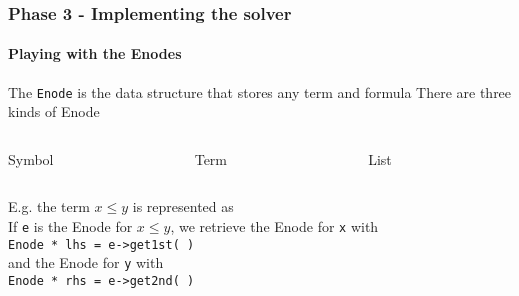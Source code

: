 \begin{frame}[fragile]
  \frametitle{Phase 3 - Implementing the solver}
  \framesubtitle{Playing with the Enodes}

  \scriptsize

  The \verb|Enode| is the data structure that stores any
  term and formula
  \vfill
  There are three kinds of Enode
  \vfill
  \begin{columns}

    \begin{column}{.2\textwidth}
      \begin{center}
      Symbol
      \bigskip\\
       
      \end{center}
    \end{column}

    \begin{column}{.3\textwidth}
      \begin{center}
      Term
      \bigskip\\
       
      \end{center}
    \end{column}

    \begin{column}{.45\textwidth}
      \begin{center}
      List
      \bigskip\\
       
      \end{center}
    \end{column}

  \end{columns}

  \vfill\pause

  \begin{columns}

    \begin{column}{.5\textwidth}
      E.g. the term $x \leq y$ is represented as
      \bigskip\\
      If \verb|e| is the Enode for $x \leq y$, we retrieve
      the Enode for \verb|x| with\\
      \verb|Enode * lhs = e->get1st( )|
      \medskip\\
      and the Enode for \verb|y| with\\
      \verb|Enode * rhs = e->get2nd( )|
    \end{column}

    \begin{column}{.5\textwidth}

      \begin{center}
        \scalebox{.7}{}
      \end{center}

    \end{column}

  \end{columns}

\end{frame}

